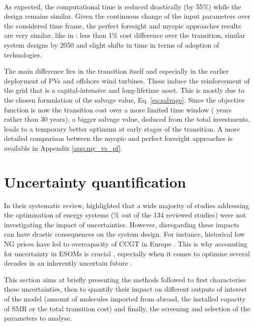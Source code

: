 \\

\noindent
As expected, the computational time is reduced drastically (\ie by 55\%) while the design remains similar.  Given the continuous change of the input parameters over the considered time frame, the perfect foresight and myopic approaches results are very similar, like in \cite{krey2006vergleich}: less than 1\% cost difference over the transition, similar system designs by 2050 and slight shifts in time in terms of adoption of technologies. 

The main difference lies in the transition itself and especially in the earlier deployment of PVs and offshore wind turbines. These induce the reinforcement of the grid that is a capital-intensive and long-lifetime asset. This is mostly due to the chosen formulation of the salvage value, Eq. \ref{eq:salvage}. Since the objective function is now the transition cost over a more limited time window ( years rather than 30 years), a bigger salvage value, deduced from the total investments, leads to a temporary better optimum at early stages of the transition. A more detailed comparison between the myopic and perfect foresight approaches is available in Appendix \ref{app:my_vs_pf}.

\section{Uncertainty quantification}
\label{sec:meth:UQ}
In their systematic review, \citet{yue2018review} highlighted that a wide majority of studies addressing the optimisation of energy systems (\% out of the 134 reviewed studies) were not investigating the impact of uncertainties. However, disregarding these impacts can have drastic consequences on the system design. For instance, historical low \gls{NG} prices have led to overcapacity of \gls{CCGT} in Europe \cite{moret2020overcapacity}. This is why accounting for uncertainty in \gls{ESOMs} is crucial \cite{mavromatidis2018uncertainty}, especially when it comes to optimise several decades in an inherently uncertain future \cite{peace2008insights}.

This section aims at briefly presenting the methods followed to first characterise these uncertainties, then to quantify their impact on different outputs of interest of the model (\eg amount of molecules imported from abroad, the installed capacity of \gls{SMR} or the total transition cost) and finally, the screening and selection of the parameters to analyse.

